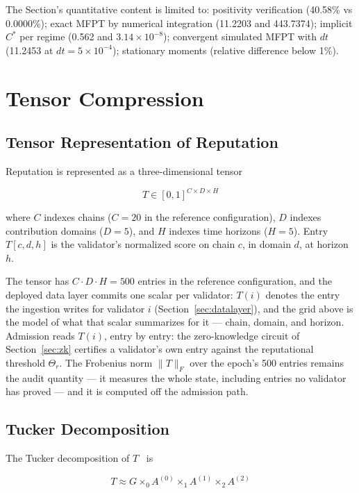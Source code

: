 \documentclass[11pt,a4paper]{article}
\numberwithin{equation}{section}
\numberwithin{table}{section}
\begin{document}
The Section's quantitative content is limited to: positivity verification (40.58\% vs 0.0000\%); exact MFPT by numerical integration (11.2203 and 443.7374); implicit $C^*$ per regime (0.562 and $3.14 \times 10^{-8}$); convergent simulated MFPT with $dt$ (11.2453 at $dt = 5 \times 10^{-4}$); stationary moments (relative difference below 1\%).

\section{Tensor Compression}
\label{sec:tensor}

\subsection{Tensor Representation of Reputation}
Reputation is represented as a three-dimensional tensor

\begin{equation}
T \in [0,1]^{C \times D \times H}
\label{eq:tensor}
\end{equation}

where $C$ indexes chains ($C = 20$ in the reference configuration), $D$ indexes contribution domains ($D = 5$), and $H$ indexes time horizons ($H = 5$). Entry $T[c,d,h]$ is the validator's normalized score on chain $c$, in domain $d$, at horizon $h$.

The tensor has $C \cdot D \cdot H = 500$ entries in the reference configuration, and the deployed data layer commits one scalar per validator: $T(i)$ denotes the entry the ingestion writes for validator $i$ (Section~\ref{sec:datalayer}), and the grid above is the model of what that scalar summarizes for it --- chain, domain, and horizon. Admission reads $T(i)$, entry by entry: the zero-knowledge circuit of Section~\ref{sec:zk} certifies a validator's own entry against the reputational threshold $\Theta_r$. The Frobenius norm $\|T\|_F$ over the epoch's 500 entries remains the audit quantity --- it measures the whole state, including entries no validator has proved --- and it is computed off the admission path.

\subsection{Tucker Decomposition}
The Tucker decomposition of $T$~\cite{tucker1966} is

\begin{equation}
T \approx G \times_0 A^{(0)} \times_1 A^{(1)} \times_2 A^{(2)}
\label{eq:tucker}
\end{equation}
\end{document}
